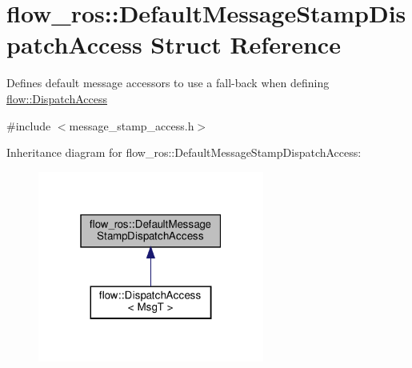 \hypertarget{structflow__ros_1_1_default_message_stamp_dispatch_access}{}\section{flow\+\_\+ros\+:\+:Default\+Message\+Stamp\+Dispatch\+Access Struct Reference}
\label{structflow__ros_1_1_default_message_stamp_dispatch_access}


Defines default message accessors to use a fall-\/back when defining {\ttfamily \hyperlink{structflow_1_1_dispatch_access}{flow\+::\+Dispatch\+Access}}  




{\ttfamily \#include $<$message\+\_\+stamp\+\_\+access.\+h$>$}



Inheritance diagram for flow\+\_\+ros\+:\+:Default\+Message\+Stamp\+Dispatch\+Access\+:\nopagebreak
\begin{figure}[H]
\begin{center}
\leavevmode
\includegraphics[width=211pt]{structflow__ros_1_1_default_message_stamp_dispatch_access__inherit__graph}
\end{center}
\end{figure}

